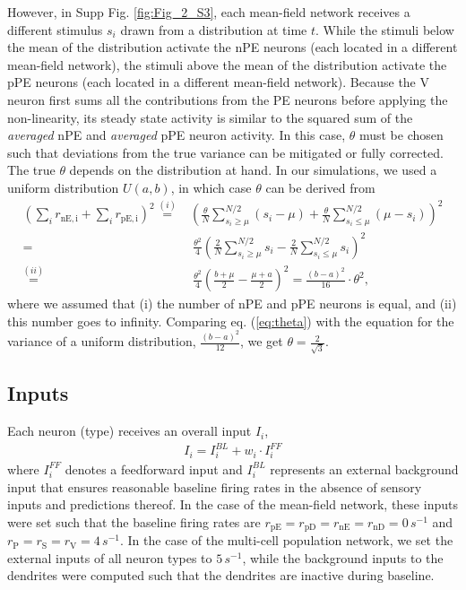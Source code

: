 \documentclass[10pt,a4paper]{article}
\begin{document}
However, in Supp Fig. \ref{fig:Fig_2_S3}, each mean-field network receives a different stimulus $s_i$ drawn from a distribution at time $t$. While the stimuli below the mean of the distribution activate the nPE neurons (each located in a different mean-field network), the stimuli above the mean of the distribution activate the pPE neurons (each located in a different mean-field network). Because the V neuron first sums all the contributions from the PE neurons before applying the non-linearity, its steady state activity is similar to the squared sum of the \textit{averaged} nPE and \textit{averaged} pPE neuron activity. In this case, $\theta$ must be chosen such that deviations from the true variance can be mitigated or fully corrected. The true $\theta$ depends on the distribution at hand. In our simulations, we used a uniform distribution $U(a,b)$, in which case $\theta$ can be derived from
%
\begin{align}
\left( \sum_{i} r_\mathrm{nE,i} + \sum_{i} r_\mathrm{pE,i}\right)^2 \overset{(i)}{=} & \left( \frac{\theta}{N}  \sum_{s_i \geq \mu}^{N/2} (s_i - \mu) + \frac{\theta}{N}  \sum_{s_i \leq \mu}^{N/2} (\mu - s_i )\right)^2 \nonumber \\
%
=&\ \frac{\theta^2}{4} \left( \frac{2}{N} \sum_{s_i \geq \mu}^{N/2} s_i - \frac{2}{N} \sum_{s_i \leq \mu}^{N/2} s_i\right)^2\nonumber\\
%
\overset{(ii)}{=}&\ \frac{\theta^2}{4} \left( \frac{b+\mu}{2} - \frac{\mu + a}{2} \right)^2 = \frac{(b-a)^2}{16} \cdot \theta^2,
\label{eq:theta}
\end{align}
%
where we assumed that (i) the number of nPE and pPE neurons is equal, and (ii) this number goes to infinity. Comparing eq. (\ref{eq:theta}) with the equation for the variance of a uniform distribution, $\frac{(b-a)^2}{12}$, we get $\theta = \frac{2}{\sqrt{3}}$.

\subsection{Inputs}
%
Each neuron (type) receives an overall input $I_i$,
%
\begin{align*}
I_i = I_i^{BL} + w_i \cdot I_{i}^{FF}
\end{align*}
%
where $I_{i}^{FF}$ denotes a feedforward input and $I_i^{BL}$ represents an external background input that ensures reasonable baseline firing rates in the absence of sensory inputs and predictions thereof. In the case of the mean-field network, these inputs were set such that the baseline firing rates are $r_\mathrm{pE}=r_\mathrm{pD}=r_\mathrm{nE}=r_\mathrm{nD}=0\, s^{-1}$ and $r_\mathrm{P} = r_\mathrm{S}=r_\mathrm{V}=4\, s^{-1}$. In the case of the multi-cell population network, we set the external inputs of all neuron types to $5\, s^{-1}$, while the background inputs to the dendrites were computed such that the dendrites are inactive during baseline.
\end{document}
